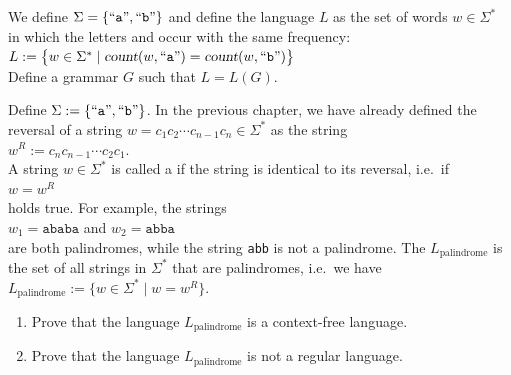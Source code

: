 \exerciseEng
We define $\Sigma = \{ \mbox{``\texttt{a}''}, \mbox{``\texttt{b}''} \}$ and define the language $L$ as the
set of words $w\in\Sigma^*$ in which the letters  and  occur with the
same frequency:
\\[0.2cm]
\hspace*{1.3cm}
$L := \bigl\{ w \in \Sigma^* \mid \textsl{count}(w,\mbox{``\texttt{a}''}) = \textsl{count}(w,\mbox{``\texttt{b}''})\bigr\}$
\\[0.2cm]
Define a grammar $G$ such that $L = L(G)$.
\eox

\exerciseEng
Define $\Sigma := \{ \mbox{``\texttt{a}''}, \mbox{``\texttt{b}''} \}$. 
In the previous chapter, we have already defined the reversal of a string 
$w = c_1 c_2 \cdots c_{n-1} c_n \in \Sigma^*$ as the string
\\[0.2cm]
\hspace*{1.3cm}
$w^R := c_n c_{n-1} \cdots c_2 c_1$.
\\[0.2cm]
A string $w \in \Sigma^*$ is called a
\href{http://en.wikipedia.org/wiki/Palindrome}{}  if the string is identical to its
reversal, i.e.~if
\\[0.2cm]
\hspace*{1.3cm}
$w = w^R$
\\[0.2cm]
holds true.  For example, the strings 
\\[0.2cm]
\hspace*{1.3cm}
$w_1 = \mathtt{ababa}$ \quad and \quad $w_2 = \mathtt{abba}$
\\[0.2cm]
are both palindromes, while the string \texttt{abb} is not a palindrome. The 
 $L_\mathrm{palindrome}$ is the set of all 
strings in $\Sigma^*$ that are palindromes, i.e.~we have
\\[0.2cm]
\hspace*{1.3cm}
$L_\mathrm{palindrome} := \bigl\{ w \in \Sigma^* \mid w = w^R \bigr\}$.
\renewcommand{\labelenumi}{(\alph{enumi})}
\begin{enumerate}
\item Prove that the language $L_\mathrm{palindrome}$ is a context-free language.
\item Prove that the language $L_\mathrm{palindrome}$ is not a regular language.  \eox
\end{enumerate}
\renewcommand{\labelenumi}{\arabic{enumi}.}
 


